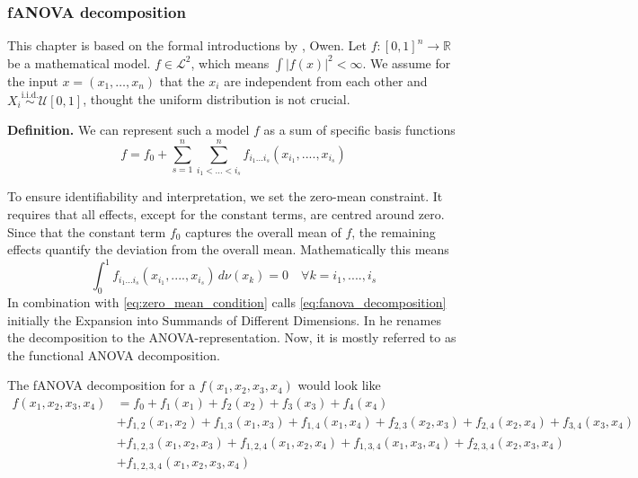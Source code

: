 \subsubsection*{fANOVA decomposition}
This chapter is based on the formal introductions by \cite{sobol1993sensitivity, sobol2001, hooker2004}, Owen.
Let $f: [0,1]^n \rightarrow \mathbb{R}$  be a mathematical model. $f \in \mathcal{L}^2$, which means $\int|f(x)|^2 < \infty$. We assume for the input $x = (x_1,\dots, x_n)$ that the $x_i$ are independent from each other and $X_i \overset{\text{i.i.d.}}{\sim} \mathcal{U}[0, 1]$, thought the uniform distribution is not crucial.\par

\textbf{Definition.} We can represent such a model $f$ as a sum of specific basis functions
\begin{equation}
    f = f_0 + \sum_{s=1}^{n} \sum_{i_1 <...<i_s}^{n} f_{i_{1}...i_{s}} (x_{i_{1}} , ....,x_{i_{s}})
    \label{eq:fanova_decomposition}
\end{equation}

To ensure identifiability and interpretation, we set the zero-mean constraint. It requires that all effects, except for the constant terms, are centred around zero. Since that the constant term $f_0$ captures the overall mean of $f$, the remaining effects quantify the deviation from the overall mean. Mathematically this means
\begin{equation}
    \int_{0}^{1} f_{i_{1}...i_{s}} (x_{i_{1}}, ...., x_{i_{s}}) \, d\nu (x_k) = 0 \quad \forall k = i_1, ...., i_s
    \label{eq:zero_mean_condition}
\end{equation}
In combination with \autoref{eq:zero_mean_condition}  \cite{sobol1993sensitivity} calls \autoref{eq:fanova_decomposition} initially the \ldq Expansion into Summands of Different Dimensions\rdq. In \cite{sobol2001} he renames the decomposition to the \ldq ANOVA-representation\rdq. Now, it is mostly referred to as the \ldq functional ANOVA decomposition\rdq \citep{hooker2004}.\par

The fANOVA decomposition for a \( f(x_1, x_2, x_3, x_4) \) would look like
\begin{align*}
    f(x_1, x_2, x_3, x_4) &= f_0 + f_1(x_1) + f_2(x_2) + f_3(x_3) + f_4(x_4) \\
    &+ f_{1,2}(x_1, x_2) + f_{1,3}(x_1, x_3) + f_{1,4}(x_1, x_4) + f_{2,3}(x_2, x_3) + f_{2,4}(x_2, x_4) + f_{3,4}(x_3, x_4) \\
    &+ f_{1,2,3}(x_1, x_2, x_3) + f_{1,2,4}(x_1, x_2, x_4) + f_{1,3,4}(x_1, x_3, x_4) + f_{2,3,4}(x_2, x_3, x_4) \\
    &+ f_{1,2,3,4}(x_1, x_2, x_3, x_4)
\end{align*}

